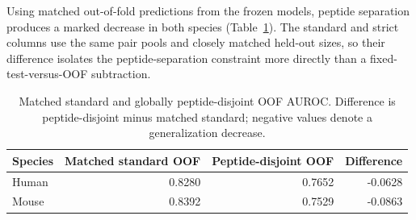 Using matched out-of-fold predictions from the frozen models, peptide separation produces a marked decrease in both species (Table~\ref{tab:standard-strict-summary}). The standard and strict columns use the same pair pools and closely matched held-out sizes, so their difference isolates the peptide-separation constraint more directly than a fixed-test-versus-OOF subtraction.

\begin{table}[tbp]
\centering
\caption{Matched standard and globally peptide-disjoint OOF AUROC. Difference is peptide-disjoint minus matched standard; negative values denote a generalization decrease.}
\label{tab:standard-strict-summary}
\small
\begin{tabular}{lrrr}
\toprule
Species & Matched standard OOF & Peptide-disjoint OOF & Difference \\ 
\midrule
Human & 0.8280 & 0.7652 & -0.0628 \\ 
Mouse & 0.8392 & 0.7529 & -0.0863 \\ 
\bottomrule
\end{tabular}
\end{table}

